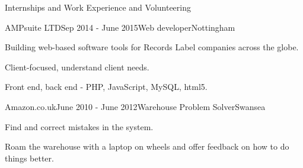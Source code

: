 \documentclass{resume} %
\begin{document}
\begin{rSection}{Internships and Work Experience and Volunteering}

  \begin{rSubsection}{AMPsuite LTD}{Sep 2014 - June 2015}{Web developer}{Nottingham}
        \item Building web-based software tools for Records Label companies across the globe.
        \item Client-focused, understand client needs.
        \item Front end, back end - PHP, JavaScript, MySQL, html5.
    \end{rSubsection}
    \begin{rSubsection}{Amazon.co.uk}{June 2010 - June 2012}{Warehouse Problem Solver}{Swansea}
        \item  Find and correct mistakes in the system.
        \item  Roam the warehouse with a laptop on wheels and offer feedback on how to do things better.
\end{rSubsection}

\end{rSection}
\end{document}
